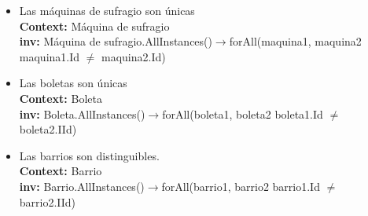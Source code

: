 \documentclass[spanish, 10pt,a4paper]{article}
\numberwithin{equation}{section} %
\begin{document}
\begin{itemize}
	\item Las máquinas de sufragio son únicas
\\	\textbf{Context: }  Máquina de sufragio
\\	\textbf{inv: } Máquina de sufragio.AllInstances()$\rightarrow$forAll(maquina1, maquina2 \textbar maquina1.Id $\neq$ maquina2.Id)

	\item Las boletas son únicas
\\	\textbf{Context: }  Boleta
\\	\textbf{inv: } Boleta.AllInstances()$\rightarrow$forAll(boleta1, boleta2 \textbar boleta1.Id $\neq$ boleta2.IId)

	\item Las barrios son distinguibles.
\\	\textbf{Context: }  Barrio
\\	\textbf{inv: } Barrio.AllInstances()$\rightarrow$forAll(barrio1, barrio2 \textbar barrio1.Id $\neq$ barrio2.IId)
\end{itemize}
\end{document}
